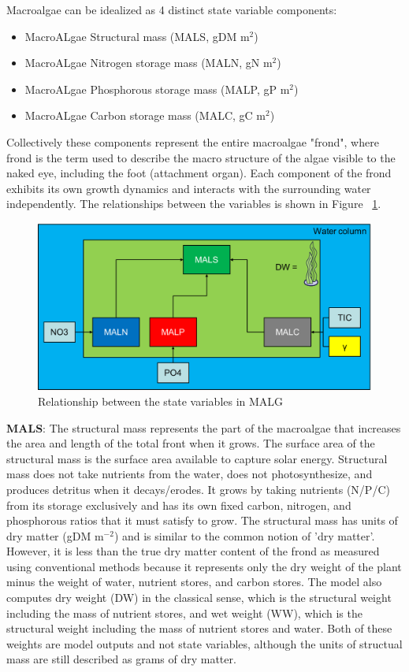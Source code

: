 \documentclass{deltares_manual}
\begin{document}
Macroalgae can be idealized as 4 distinct state variable components:
\begin{itemize}
\item MacroALgae Structural mass (MALS, gDM m$^{2}$)
\item MacroALgae Nitrogen storage mass (MALN, gN m$^{2}$)
\item MacroALgae Phosphorous storage mass (MALP, gP m$^{2}$)
\item MacroALgae Carbon storage mass (MALC, gC m$^{2}$)
\end{itemize}
Collectively these components represent the entire macroalgae "frond", where frond is the term used to describe the macro structure of the algae visible to the naked eye, including the foot (attachment organ). Each component of the frond exhibits its own growth dynamics and interacts with the surrounding water independently. The relationships between the variables is shown in Figure ~\ref{fig:statevariables}.
\begin{figure}[H]
	\centering
	\includegraphics[width=1\linewidth]{figures/state_variables}
	\caption{Relationship between the state variables in MALG}
	\label{fig:statevariables}
\end{figure}
\textbf{MALS}: The structural mass represents the part of the macroalgae that increases the area and length of the total front when it grows. The surface area of the structural mass is the surface area available to capture solar energy. Structural mass does not take nutrients from the water, does not photosynthesize, and produces detritus when it decays/erodes. It grows by taking nutrients (N/P/C) from its storage exclusively and has its own fixed carbon, nitrogen, and phosphorous ratios that it must satisfy to grow. The structural mass has units of dry matter (gDM m$^{-2}$) and is similar to the common notion of 'dry matter'. However, it is less than the true dry matter content of the frond as measured using conventional methods because it represents only the dry weight of the plant minus the weight of water, nutrient stores, and carbon stores. The model also computes dry weight (DW) in the classical sense, which is the structural weight including the mass of nutrient stores, and wet weight (WW), which is the structural weight including the mass of nutrient stores and water. Both of these weights are model outputs and not state variables, although the units of structual mass are still described as grams of dry matter.
 
\end{document}
